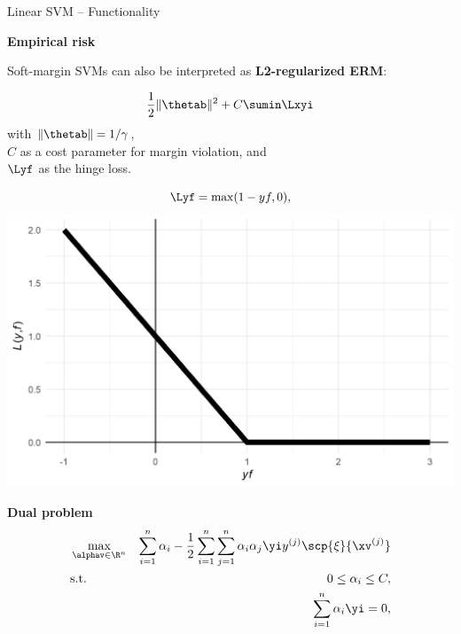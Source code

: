 \documentclass[11pt,compress,t,notes=noshow, xcolor=table]{beamer}
\newcommand{\highlight}[1]{\textcolor{highlightcol}{\textbf{#1}}}
\begin{document}
\begin{frame}{Linear SVM -- Functionality}

\footnotesize

\highlight{Empirical risk}

Soft-margin SVMs can also be interpreted as \textbf{L2-regularized ERM}: 
\begin{minipage} {0.58\textwidth}
$$ \frac{1}{2} \|\thetab\|^2 + C \sumin \Lxyi$$ 
with  $\|\thetab\| = 1 / \gamma$,\\
$C$ as a cost parameter for margin violation, and\\
$\Lyf$ as the hinge loss.
\end{minipage}
\begin{minipage} {0.4\textwidth}
$$\Lyf = \max(1-yf, 0),$$
\centering
\includegraphics[height=0.4\textwidth, keepaspectratio=true]{figure/plot-hinge-loss.png}
\end{minipage}


%     

\medskip
\highlight{Dual problem} ~~ %
\begin{eqnarray*}
    & \max\limits_{\alphav \in \R^n} & \sum_{i=1}^n \alpha_i - \frac{1}{2}\sum_{i=1}^n\sum_{j=1}^n\alpha_i\alpha_j\yi y^{(j)} \scp{\xi}{\xv^{(j)}} \\
    & \text{s.t. } & 0 \le \alpha_i \le C, \\
    & \quad & \sum_{i=1}^n \alpha_i \yi = 0,
\end{eqnarray*}


\end{frame}
\end{document}
